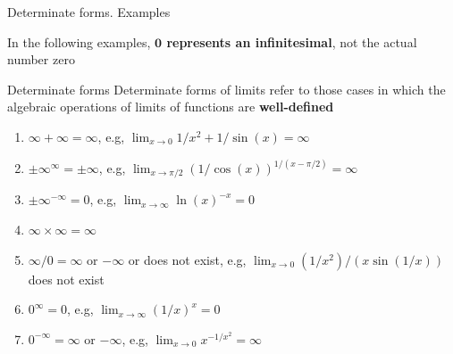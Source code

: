 \documentclass[9pt]{beamer}
\begin{document}
\begin{frame}{Determinate forms. Examples}

    In the following examples, {\bf $\pmb{0}$ represents an infinitesimal}, not the actual number zero
    \vspace{0.3cm}
    
    \begin{block}{Determinate forms}
    Determinate forms of limits refer to those cases in which the algebraic operations of limits of functions %
    are \textbf{well-defined}
        \begin{enumerate}[leftmargin = 0.5cm, label = $\bullet$, rightmargin = 0.2cm]
            
            \item $\infty + \infty = \infty$,\quad
            e.g, $\lim_{x\rightarrow 0} 1/x^2 + 1/\sin(x) = \infty$
            \item $\pm\infty^{\infty} = \pm\infty$,\quad
            e.g, $\lim_{x\rightarrow \pi/2} (1/\cos(x))^{1/(x-\pi/2)} = \infty$
            \item $\pm\infty^{-\infty} = 0$,\quad
            e.g, $\lim_{x\rightarrow \infty} \ln(x)^{-x} = 0$
            \item $\infty\times\infty = \infty$
            \item $\infty/0 = \infty$ or $-\infty$ or does not exist,\quad
            e.g, $\lim_{x\rightarrow 0} (1/x^2)/(x\sin(1/x))$ does not exist
            \item $0^\infty = 0$,\quad
            e.g, $\lim_{x\rightarrow \infty} (1/x)^x = 0$
            \item $0^{-\infty} = \infty$ or $-\infty$,\quad
            e.g, $\lim_{x\rightarrow 0} x^{-1/x^2} = \infty$
            
            \end{enumerate}
    \end{block}
    
\end{frame}
\end{document}
